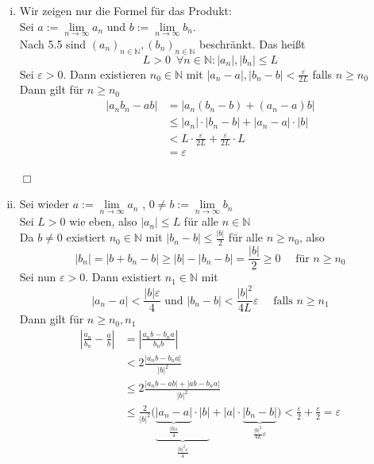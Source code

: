 \begin{enumerate}[(i)]
	\item Wir zeigen nur die Formel für das Produkt: \\
	Sei $a:= \lim\limits_{n \to \infty} a_n$ und $b:= \lim\limits_{n \to \infty} b_n$.
	\vspace{\baselineskip} \\
	Nach 5.5 sind $(a_n)_{n \in \mathds{N}}, (b_n)_{n \in \mathds{N}}$ beschränkt. Das heißt
	\[
		L > 0 \enspace \forall n \in \mathds{N} : |a_n| , |b_n| \leq L
	\]
	Sei $\varepsilon > 0$. Dann existieren $n_0 \in \mathds{N}$ mit $|a_n -a| , |b_n -b| < \frac{\varepsilon}{2L}$ falls $n \geq n_0$ \\
	Dann gilt für $n \geq n_0$
	\begin{align*}
		|a_n b_n - ab| &= |a_n (b_n - b) + (a_n - a) b| \\
		&\leq |a_n| \cdot |b_n -b| + |a_n -a| \cdot |b| \\
		&< L \cdot \frac{\varepsilon}{2L} + \frac{\varepsilon}{2L} \cdot L \\
		&= \varepsilon
	\end{align*}
	\begin{flushright}
		$\Box$
	\end{flushright}
	\item Sei wieder $a:= \lim\limits_{n \to \infty} a_n$ , $0 \not= b:= \lim\limits_{n \to \infty} b_n$
	\vspace{\baselineskip} \\
	Sei $L > 0$ wie eben, also $|a_n| \leq L$ für alle $n \in \mathds{N}$ \\
	Da $b \not= 0$ existiert $n_0 \in \mathds{N}$ mit $|b_n -b| \leq \frac{|b|}{2}$ für alle $n \geq n_0$, also 
	\[
		|b_n| = |b + b_n -b| \ge |b| - |b_n -b| = \frac{|b|}{2} \geq 0 \quad \text{  für  } n \geq n_0
	\]
	Sei nun $\varepsilon >0$. Dann existiert $n_1 \in \mathds{N}$ mit 
	\[
		|a_n -a| < \frac{|b| \varepsilon}{4} \text{ und } |b_n -b| < \frac{|b|^2}{4L} \varepsilon \quad \text{ falls } n \geq n_1
	\]
	Dann gilt für $n \geq n_0, n_1$
	\begin{align}
		\left| \frac{a_n}{b_n} -\frac{a}{b} \right| &= \left| \frac{a_n b - b_n a}{b_n b} \right| \\
		&< 2 \frac{ |a_n b - b_n a|}{|b|^2} \\
		&\leq 2 \frac{|a_n b - ab| + |ab - b_n a|}{|b|^2} \\
		&\leq \frac{2}{|b|^2} \Big( \underbrace{\underbrace{|a_n -a|}_{\frac{|b| \varepsilon}{4}} \cdot  |b|}_{\frac{|b|^2 \varepsilon}{4}} 
		+ |a| \cdot \underbrace{|b_n -b|}_{\frac{|b|^2}{4L}\varepsilon} \Big) < \frac{\varepsilon}{2} + \frac{\varepsilon}{2} = \varepsilon
	\end{align}
\end{enumerate}

